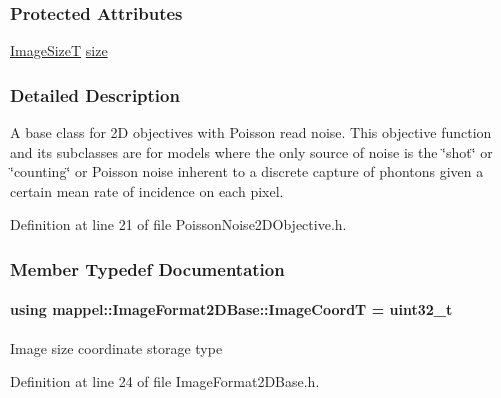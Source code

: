 \subsubsection*{Protected Attributes}
\begin{DoxyCompactItemize}
\item 
\hyperlink{classmappel_1_1ImageFormat2DBase_a49cccf61eb2a768a202634d27fcd81d5}{Image\+SizeT} \hyperlink{classmappel_1_1ImageFormat2DBase_a3be77d2aa6ec9f3815322732950c2a60}{size}
\end{DoxyCompactItemize}


\subsubsection{Detailed Description}
A base class for 2D objectives with Poisson read noise. This objective function and its subclasses are for models where the only source of noise is the \char`\"{}shot\char`\"{} or \char`\"{}counting\char`\"{} or Poisson noise inherent to a discrete capture of phontons given a certain mean rate of incidence on each pixel. 



Definition at line 21 of file Poisson\+Noise2\+D\+Objective.\+h.



\subsubsection{Member Typedef Documentation}
\paragraph[{\texorpdfstring{Image\+CoordT}{ImageCoordT}}]{\setlength{\rightskip}{0pt plus 5cm}using {\bf mappel\+::\+Image\+Format2\+D\+Base\+::\+Image\+CoordT} =  uint32\+\_\+t\hspace{0.3cm}{\ttfamily [inherited]}}\hypertarget{classmappel_1_1ImageFormat2DBase_a45e9234d63c357f34ca56c72c12b9e9c}{}\label{classmappel_1_1ImageFormat2DBase_a45e9234d63c357f34ca56c72c12b9e9c}
Image size coordinate storage type 

Definition at line 24 of file Image\+Format2\+D\+Base.\+h.


